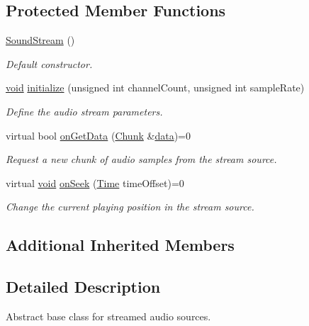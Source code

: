 \subsection*{Protected Member Functions}
\begin{DoxyCompactItemize}
\item 
\hyperlink{classsf_1_1_sound_stream_a769d08f4c3c6b4340ef3a838329d2e5c}{Sound\-Stream} ()
\begin{DoxyCompactList}\small\item\em Default constructor. \end{DoxyCompactList}\item 
\hyperlink{glutf90_8h_ac778d6f63f1aaf8ebda0ce6ac821b56e}{void} \hyperlink{classsf_1_1_sound_stream_a9c351711198ee1aa77c2fefd3ced4d2c}{initialize} (unsigned int channel\-Count, unsigned int sample\-Rate)
\begin{DoxyCompactList}\small\item\em Define the audio stream parameters. \end{DoxyCompactList}\item 
virtual bool \hyperlink{classsf_1_1_sound_stream_a968ec024a6e45490962c8a1121cb7c5f}{on\-Get\-Data} (\hyperlink{structsf_1_1_sound_stream_1_1_chunk}{Chunk} \&\hyperlink{gl3_8h_a0f78eecb0891cce3bdfc815b971866a1}{data})=0
\begin{DoxyCompactList}\small\item\em Request a new chunk of audio samples from the stream source. \end{DoxyCompactList}\item 
virtual \hyperlink{glutf90_8h_ac778d6f63f1aaf8ebda0ce6ac821b56e}{void} \hyperlink{classsf_1_1_sound_stream_a907036dd2ca7d3af5ead316e54b75997}{on\-Seek} (\hyperlink{classsf_1_1_time}{Time} time\-Offset)=0
\begin{DoxyCompactList}\small\item\em Change the current playing position in the stream source. \end{DoxyCompactList}\end{DoxyCompactItemize}
\subsection*{Additional Inherited Members}


\subsection{Detailed Description}
Abstract base class for streamed audio sources. 

